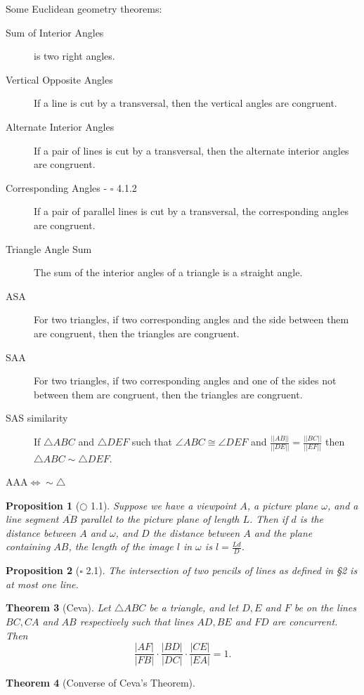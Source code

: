\documentclass[12pt]{amsart}
\newtheorem{theorem}{Theorem}
\newtheorem{proposition}[theorem]{Proposition}
\theoremstyle{remark}
\newtheorem*{basic notion}{Basic Notion}
\newcommand{\ol}[1]{\overline{#1}}
\theoremstyle{mycomment}
\begin{document}
Some Euclidean geometry theorems:
\begin{description}
\item[Sum of Interior Angles] is two right angles.
\item[Vertical Opposite Angles] If a line is cut by a transversal, then the vertical angles are congruent.
\item[Alternate Interior Angles] If a pair of lines is cut by a transversal, then the alternate interior angles are congruent.
\item[Corresponding Angles - $\square$ 4.1.2] If a pair of parallel lines is cut by a transversal, the corresponding angles are congruent.
\item[Triangle Angle Sum] The sum of the interior angles of a triangle is a straight angle.
\item[ASA] For two triangles, if two corresponding angles and the side between them are congruent, then the triangles are congruent. 
\item[SAA] For two triangles, if two corresponding angles and one of the sides not between them are congruent, then the triangles are congruent. 
\item[SAS similarity] If $\triangle ABC$ and $\triangle DEF$ such that $\angle ABC\cong\angle DEF$ and $\frac{||AB||}{||DE||}=\frac{||BC||}{||EF||}$ then $\triangle ABC\sim\triangle DEF$.
\item[AAA$\iff\sim\triangle$]
\end{description}
\begin{proposition}[$\bigcirc$ 1.1] Suppose we have a viewpoint $A$, a picture plane $\omega$, and a line segment $\ol{AB}$ parallel to the picture plane of length $L$. Then if $d$ is the distance between $A$ and $\omega$, and $D$ the distance between $A$ and the plane containing $AB$, the length of the image $l$ in $\omega$ is $l=\frac{Ld}{D}$.
\end{proposition}
\begin{proposition}[$\square$ 2.1] The intersection of two pencils of lines as defined in \S 2 is at most one line.\end{proposition}
\begin{theorem}[Ceva] Let $\triangle ABC$ be a triangle, and let $D,E$ and $F$ be on the lines $BC, CA$ and $AB$ respectively such that lines $AD, BE$ and $FD$ are concurrent. Then $$\frac{|AF|}{|FB|}\cdot\frac{|BD|}{|DC|}\cdot\frac{|CE|}{|EA|}=1.$$
\end{theorem}
\begin{theorem}[Converse of Ceva's Theorem]
\end{theorem}
\end{document}
